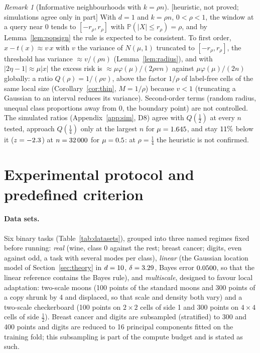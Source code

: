 \documentclass[11pt,a4paper]{article}
\theoremstyle{plain}
\theoremstyle{definition}
\theoremstyle{remark}
\newtheorem{remark}[theorem]{Remark}
\newcommand{\Prob}{\mathbb{P}}
\newcommand{\status}[1]{\textsf{\small [#1]}}
\begin{document}
\begin{remark}[Informative neighbourhoods with $k=\rho n$]\label{rem:rho}\status{heuristic, not proved; simulations agree only in part}
With $d=1$ and $k=\rho n$, $0<\rho<1$, the window at a query near $0$ tends to $[-r_\rho,r_\rho]$ with $\Prob(|X|\le r_\rho)=\rho$, and by Lemma~\ref{lem:popsign} the rule is expected to be consistent. To first order, $x-t(x)\approx v\,x$ with $v$ the variance of $N(\mu,1)$ truncated to $[-r_\rho,r_\rho]$, the threshold has variance $\approx v/(\rho n)$ (Lemma~\ref{lem:radius}), and with $|2\eta-1|\approx\mu|x|$ the excess risk is $\approx\mu\varphi(\mu)/(2\rho vn)$ against $\mu\varphi(\mu)/(2n)$ globally: a ratio $Q(\rho)=1/(\rho v)$, above the factor $1/\rho$ of label-free cells of the same local size (Corollary~\ref{cor:thin}, $M=1/\rho$) because $v<1$ (truncating a Gaussian to an interval reduces its variance). Second-order terms (random radius, unequal class proportions away from $0$, the boundary point) are not controlled. The simulated ratios (Appendix~\ref{app:sim}, D8) agree with $Q(\tfrac12)$ at every $n$ tested, approach $Q(\tfrac14)$ only at the largest $n$ for $\mu=1.645$, and stay $11\%$ below it ($z=-2.3$) at $n=32\,000$ for $\mu=0.5$: at $\rho=\tfrac14$ the heuristic is not confirmed.
\end{remark}

\section{Experimental protocol and predefined criterion}\label{sec:protocol}

\paragraph{Data sets.} Six binary tasks (Table~\ref{tab:datasets}), grouped into three named regimes fixed before running: \emph{real} (wine, class 0 against the rest; breast cancer; digits, even against odd, a task with several modes per class), \emph{linear} (the Gaussian location model of Section~\ref{sec:theory} in $d=10$, $\delta=3.29$, Bayes error $0.0500$, so that the linear reference contains the Bayes rule), and \emph{multiscale}, designed to favour local adaptation: two-scale moons (100 points of the standard moons and 300 points of a copy shrunk by 4 and displaced, so that scale and density both vary) and a two-scale checkerboard (100 points on $2\times2$ cells of side 1 and 300 points on $4\times4$ cells of side $\tfrac12$). Breast cancer and digits are subsampled (stratified) to 300 and 400 points and digits are reduced to 16 principal components fitted on the training fold; this subsampling is part of the compute budget and is stated as such.
\end{document}
